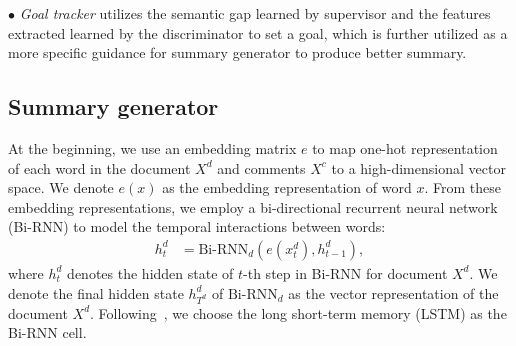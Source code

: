 \documentclass[letterpaper]{article} %
\begin{document}
$\bullet$ \textit{Goal tracker} utilizes the semantic gap learned by supervisor and the features extracted learned by the discriminator to set a goal, which is further utilized as a more specific guidance for summary generator to produce better summary.


\subsection{Summary generator}

At the beginning, we use an embedding matrix $e$ to map one-hot representation of each word in the document $X^d$ and comments $X^c$ to a high-dimensional vector space.
We denote $e(x)$ as the embedding representation of word $x$.
From these embedding representations, we employ a bi-directional recurrent neural network (Bi-RNN) to model the temporal interactions between words:
\begin{align}
    h^d_t &= \text{Bi-RNN}_d(e(x^d_t), h^d_{t-1}) ,
\end{align}
\noindent where $h^{d}_t$ denotes the hidden state of $t$-th step in Bi-RNN for document $X^d$. 
We denote the final hidden state $h^d_{T^d}$ of $\text{Bi-RNN}_d$ as the vector representation of the document $X^d$.
Following~\cite{see2017get,Ma2018AHE}, we choose the long short-term memory (LSTM) as the Bi-RNN cell. 
\end{document}
